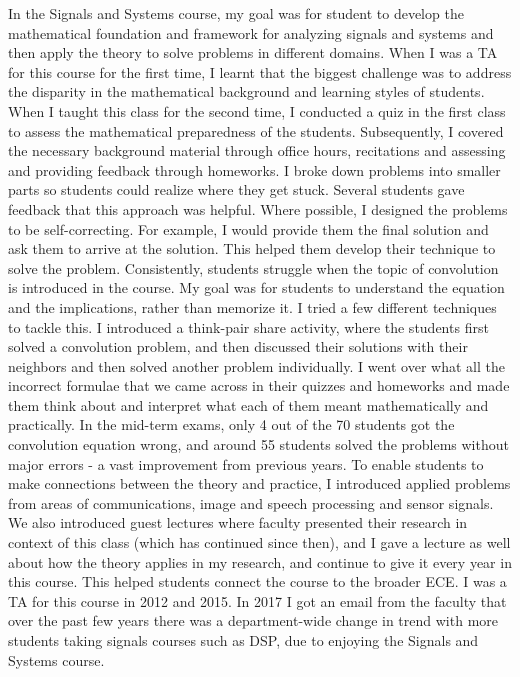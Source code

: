 \documentclass[10pt]{article}
\begin{document}
In the Signals and Systems course, my goal was for student to develop the mathematical foundation and framework for analyzing signals and systems and then apply the theory to solve problems in different domains. 
When I was a TA for this course for the first time, I learnt that the biggest challenge was to address the disparity in the mathematical background and learning styles of students. When I taught this class for the second time, I conducted a quiz in the first class to assess the mathematical preparedness of the students. Subsequently, I covered the necessary background material through office hours, recitations and assessing and providing feedback through homeworks. I broke down problems into smaller parts so students could realize where they get stuck. Several students gave feedback that this approach was helpful. Where possible, I designed the problems to be self-correcting. For example, I would provide them the final solution and ask them to arrive at the solution. This helped them develop their technique to solve the problem. %
Consistently, students struggle when the topic of convolution is introduced in the course. %
My goal was for students to understand the equation and the implications, rather than memorize it. 
I tried a few different techniques to tackle this. I introduced a think-pair share activity, where the students first solved a convolution problem, and then discussed their solutions with their neighbors and then solved another problem individually. I went over what all the incorrect formulae that we came across in their quizzes and homeworks and made them think about and interpret what each of them meant mathematically and practically. In the mid-term exams, only 4 out of the 70 students got the convolution equation wrong, and around 55 students solved the problems without major errors - a vast improvement from previous years. To enable students to make connections between the theory and practice, I introduced applied problems from areas of communications, image and speech processing and sensor signals. We also introduced guest lectures where faculty presented their research in context of this class (which has continued since then), and I gave a lecture as well about how the theory applies in my research, and continue to give it every year in this course. This helped students connect the course to the broader ECE. I was a TA for this course in 2012 and 2015. In 2017 I got an email from the faculty that over the past few years there was a department-wide change in trend with more students taking signals courses such as DSP, due to enjoying the Signals and Systems course.
\end{document}
